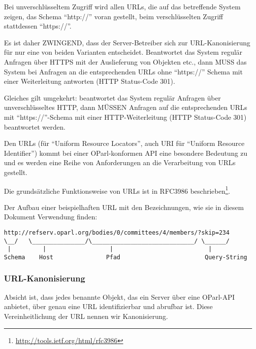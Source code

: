\documentclass[,a4paper]{article}
\begin{document}
Bei unverschlüsseltem Zugriff wird allen URLs, die auf das betreffende
System zeigen, das Schema ``http://'' voran gestellt, beim
verschlüsselten Zugriff stattdessen ``https://''.

Es ist daher ZWINGEND, dass der Server-Betreiber sich zur
URL-Kanonisierung für nur eine von beiden Varianten entscheidet.
Beantwortet das System regulär Anfragen über HTTPS mit der Auslieferung
von Objekten etc., dann MUSS das System bei Anfragen an die
entsprechenden URLs ohne ``https://'' Schema mit einer Weiterleitung
antworten (HTTP Status-Code 301).

Gleiches gilt umgekehrt: beantwortet das System regulär Anfragen über
unverschlüsseltes HTTP, dann MÜSSEN Anfragen auf die entsprechenden URLs
mit ``https://''-Schema mit einer HTTP-Weiterleitung (HTTP Status-Code
301) beantwortet werden.


Den URLs (für ``Uniform Resource Locators'', auch URI für ``Uniform
Resource Identifier'') kommt bei einer OParl-konformen API eine
besondere Bedeutung zu und es werden eine Reihe von Anforderungen an die
Verarbeitung von URLs gestellt.

Die grundsätzliche Funktionsweise von URLs ist in RFC3986
beschrieben\footnote{\url{http://tools.ietf.org/html/rfc3986}}.

Der Aufbau einer beispielhaften URL mit den Bezeichnungen, wie sie in
diesem Dokument Verwendung finden:

\begin{verbatim}
http://refserv.oparl.org/bodies/0/committees/4/members/?skip=234
\__/   \_______________/\_____________________________/ \______/
 |         |                  |                           |
Schema    Host               Pfad                        Query-String
\end{verbatim}

\subsubsection{URL-Kanonisierung}\label{url-kanonisierung}

Absicht ist, dass jedes benannte Objekt, das ein Server über eine
OParl-API anbietet, über genau eine URL identifizierbar und abrufbar
ist. Diese Vereinheitlichung der URL nennen wir Kanonisierung.
\end{document}

